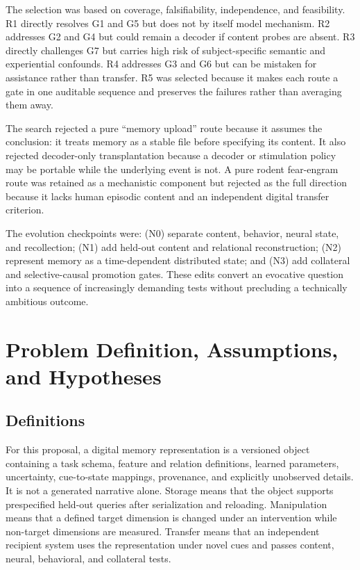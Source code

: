 \documentclass[conference]{IEEEtran}
\begin{document}
The selection was based on coverage, falsifiability, independence, and feasibility. R1 directly resolves G1 and G5 but does not by itself model mechanism. R2 addresses G2 and G4 but could remain a decoder if content probes are absent. R3 directly challenges G7 but carries high risk of subject-specific semantic and experiential confounds. R4 addresses G3 and G6 but can be mistaken for assistance rather than transfer. R5 was selected because it makes each route a gate in one auditable sequence and preserves the failures rather than averaging them away.

The search rejected a pure ``memory upload'' route because it assumes the conclusion: it treats memory as a stable file before specifying its content. It also rejected decoder-only transplantation because a decoder or stimulation policy may be portable while the underlying event is not. A pure rodent fear-engram route was retained as a mechanistic component but rejected as the full direction because it lacks human episodic content and an independent digital transfer criterion.

The evolution checkpoints were: (N0) separate content, behavior, neural state, and recollection; (N1) add held-out content and relational reconstruction; (N2) represent memory as a time-dependent distributed state; and (N3) add collateral and selective-causal promotion gates. These edits convert an evocative question into a sequence of increasingly demanding tests without precluding a technically ambitious outcome.

\section{Problem Definition, Assumptions, and Hypotheses}
\subsection{Definitions}
For this proposal, a digital memory representation is a versioned object containing a task schema, feature and relation definitions, learned parameters, uncertainty, cue-to-state mappings, provenance, and explicitly unobserved details. It is not a generated narrative alone. Storage means that the object supports prespecified held-out queries after serialization and reloading. Manipulation means that a defined target dimension is changed under an intervention while non-target dimensions are measured. Transfer means that an independent recipient system uses the representation under novel cues and passes content, neural, behavioral, and collateral tests.
\end{document}
